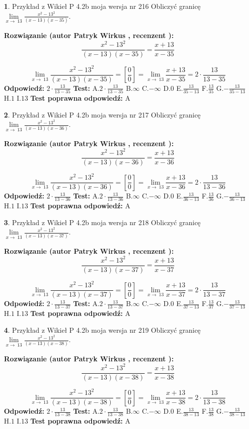 \documentclass[12pt, a4paper]{article}
\theoremstyle{definition} %
\newtheorem{zad}{}
\newcommand{\zadStart}[1]{\begin{zad}#1\newline}
\newcommand{\zadStop}{\end{zad}}
\newcommand{\rozwStart}[2]{\noindent \textbf{Rozwiązanie (autor #1 , recenzent #2): }\newline}
\newcommand{\rozwStop}{\newline}
\newcommand{\odpStart}{\noindent \textbf{Odpowiedź:}\newline}
\newcommand{\odpStop}{\newline}
\newcommand{\testStart}{\noindent \textbf{Test:}\newline}
\newcommand{\testStop}{\newline}
\newcommand{\kluczStart}{\noindent \textbf{Test poprawna odpowiedź:}\newline}
\newcommand{\kluczStop}{\newline}
\begin{document}
\zadStart{Przykład z Wikieł P 4.2b moja wersja nr 216}
Obliczyć granicę $\lim\limits_{x\to\ 13}\frac{x^{2}-13^{2}}{(x-13)(x-35)}$.
\zadStop
\rozwStart{Patryk Wirkus}{}
$$\frac{x^{2}-13^{2}}{(x-13)(x-35)}=\frac{x+13}{x-35}$$

$$\lim\limits_{x\to\ 13}\frac{x^{2}-13^{2}}{(x-13)(x-35)}=[\frac{0}{0}]=\lim\limits_{x\to\ 13}\frac{x+13}{x-35}=2 \cdot \frac{13}{13-35}$$
\rozwStop
\odpStart
$2 \cdot \frac{13}{13-35}$
\odpStop
\testStart
A.$2 \cdot \frac{13}{13-35}$
B.$\infty$
C.$-\infty$
D.$0$
E.$\frac{13}{35-13}$
F.$\frac{13}{35}$
G.$-\frac{13}{35-13}$
H.$1$
I.$13$
\testStop
\kluczStart
A
\kluczStop



\zadStart{Przykład z Wikieł P 4.2b moja wersja nr 217}
Obliczyć granicę $\lim\limits_{x\to\ 13}\frac{x^{2}-13^{2}}{(x-13)(x-36)}$.
\zadStop
\rozwStart{Patryk Wirkus}{}
$$\frac{x^{2}-13^{2}}{(x-13)(x-36)}=\frac{x+13}{x-36}$$

$$\lim\limits_{x\to\ 13}\frac{x^{2}-13^{2}}{(x-13)(x-36)}=[\frac{0}{0}]=\lim\limits_{x\to\ 13}\frac{x+13}{x-36}=2 \cdot \frac{13}{13-36}$$
\rozwStop
\odpStart
$2 \cdot \frac{13}{13-36}$
\odpStop
\testStart
A.$2 \cdot \frac{13}{13-36}$
B.$\infty$
C.$-\infty$
D.$0$
E.$\frac{13}{36-13}$
F.$\frac{13}{36}$
G.$-\frac{13}{36-13}$
H.$1$
I.$13$
\testStop
\kluczStart
A
\kluczStop



\zadStart{Przykład z Wikieł P 4.2b moja wersja nr 218}
Obliczyć granicę $\lim\limits_{x\to\ 13}\frac{x^{2}-13^{2}}{(x-13)(x-37)}$.
\zadStop
\rozwStart{Patryk Wirkus}{}
$$\frac{x^{2}-13^{2}}{(x-13)(x-37)}=\frac{x+13}{x-37}$$

$$\lim\limits_{x\to\ 13}\frac{x^{2}-13^{2}}{(x-13)(x-37)}=[\frac{0}{0}]=\lim\limits_{x\to\ 13}\frac{x+13}{x-37}=2 \cdot \frac{13}{13-37}$$
\rozwStop
\odpStart
$2 \cdot \frac{13}{13-37}$
\odpStop
\testStart
A.$2 \cdot \frac{13}{13-37}$
B.$\infty$
C.$-\infty$
D.$0$
E.$\frac{13}{37-13}$
F.$\frac{13}{37}$
G.$-\frac{13}{37-13}$
H.$1$
I.$13$
\testStop
\kluczStart
A
\kluczStop



\zadStart{Przykład z Wikieł P 4.2b moja wersja nr 219}
Obliczyć granicę $\lim\limits_{x\to\ 13}\frac{x^{2}-13^{2}}{(x-13)(x-38)}$.
\zadStop
\rozwStart{Patryk Wirkus}{}
$$\frac{x^{2}-13^{2}}{(x-13)(x-38)}=\frac{x+13}{x-38}$$

$$\lim\limits_{x\to\ 13}\frac{x^{2}-13^{2}}{(x-13)(x-38)}=[\frac{0}{0}]=\lim\limits_{x\to\ 13}\frac{x+13}{x-38}=2 \cdot \frac{13}{13-38}$$
\rozwStop
\odpStart
$2 \cdot \frac{13}{13-38}$
\odpStop
\testStart
A.$2 \cdot \frac{13}{13-38}$
B.$\infty$
C.$-\infty$
D.$0$
E.$\frac{13}{38-13}$
F.$\frac{13}{38}$
G.$-\frac{13}{38-13}$
H.$1$
I.$13$
\testStop
\kluczStart
A
\kluczStop
\end{document}
